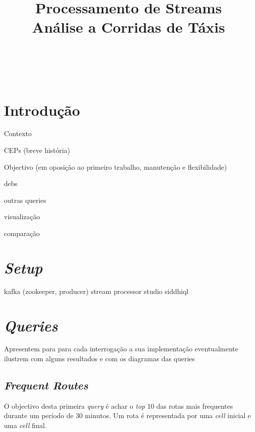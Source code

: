\documentclass[article]{IEEEtran}
\begin{document}
\title{Processamento de Streams\\Análise a Corridas de Táxis}


\author{\\
\and
{}\\
}

\maketitle



\section{Introdução}
Contexto

CEPs (breve história)

Objectivo (em oposição ao primeiro trabalho, manutenção e flexibilidade)

	debs
	
	outras queries
	
	visualização
	
	comparação
	

	
\section{\textit{Setup}}
kafka (zookeeper, producer)
stream processor studio
siddhiql


\section{\textit{Queries}}
Apresentem para para cada interrogação a sua implementação eventualmente ilustrem com alguns resultados 
e com os diagramas das queries

\subsection{\textit{Frequent Routes}}

O objectivo desta primeira \textit{query} é achar o \textit{top} 10 das rotas mais frequentes durante um período de 30 minutos. Um rota é representada por uma \textit{cell} inicial e uma \textit{cell} final.
\end{document}
